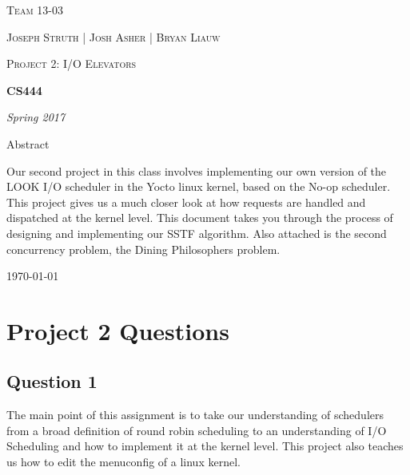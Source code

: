 \documentclass[10pt,draftclsnofoot,onecolumn, compsoc]{IEEEtran}
\begin{document}
\begin{titlepage}
	\centering
	{\scshape\LARGE Team 13-03 \par}
	\vspace{1cm}
	{\scshape\Large Joseph Struth  |  Josh Asher  |   Bryan Liauw\par}
    \vspace{1cm}
    	{\scshape\Large Project 2: I/O Elevators \par}
	\vspace{1.5cm}
	{\huge\bfseries CS444\par}
	\vspace{2cm}
	{\Large\itshape Spring 2017\par}
	\vspace{4cm}
	{\large Abstract\par}
	\vspace{1cm}
	Our second project in this class involves implementing our own version of the LOOK I/O scheduler in the Yocto linux kernel, based on the No-op scheduler. This project gives us a much closer look at how requests are handled and dispatched at the kernel level.
	This document takes you through the process of designing and implementing our SSTF algorithm. Also attached is the second concurrency problem, the Dining Philosophers problem.
	\vfill

	{\large \today\par}
\end{titlepage}

\section{Project 2 Questions}
\subsection{Question 1}
The main point of this assignment is to take our understanding of schedulers from a broad definition of round robin scheduling to an understanding of I/O Scheduling and how to implement it at the kernel level. This project also teaches us how to edit the menuconfig of a linux kernel. 
\end{document}
